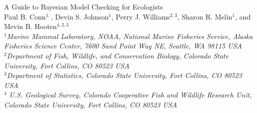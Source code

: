 \documentclass[12pt,english]{article}
\begin{document}
\begin{spacing}{1.9}


\begin{center}
  \large
  A Guide to Bayesian Model Checking for Ecologists
  \bigskip\\
  \normalsize {\sc Paul B. Conn$^{1,}$\footnotemark[5], Devin S. Johnson$^1$, Perry J. Williams$^{2,3}$, Sharon R. Melin$^1$, and Mevin
    B. Hooten$^{4,2,3}$
     }\smallskip\\
  $^1${\em Marine Mammal Laboratory, NOAA, National Marine
    Fisheries Service, Alaska Fisheries Science Center, 7600 Sand
    Point Way NE, Seattle, WA 98115 USA }\\ \medskip $^2${\em Department of Fish, Wildlife, and
    Conservation Biology, Colorado State University, Fort Collins, CO
    80523 USA } \\ \medskip  $^3${\em Department of Statistics, Colorado
    State University, Fort Collins, CO 80523 USA }\\ \medskip $^4${\em
    U.S. Geological Survey, Colorado Cooperative Fish and Wildlife
    Research Unit, Colorado State University, Fort Collins, CO 80523
    USA }\\ \medskip
\end{center}


\raggedright \setlength{\parindent}{0.3in}
{}

\linenumbers


\end{spacing}
\end{document}
